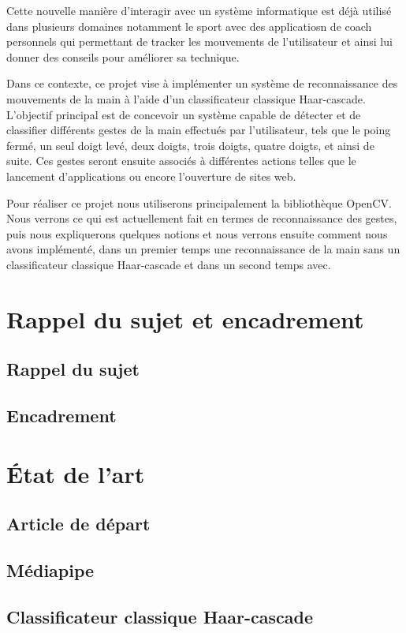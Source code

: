 \documentclass[11pt]{article}
\begin{document}
Cette nouvelle manière d'interagir avec un système informatique est déjà utilisé dans plusieurs domaines notamment le sport avec des applicatiosn de coach personnels qui permettant de tracker les mouvements de l'utilisateur et ainsi lui donner des conseils pour améliorer sa technique. \bigbreak

Dans ce contexte, ce projet vise à implémenter un système de reconnaissance des mouvements de la main à l’aide d’un classificateur classique Haar-cascade. 
L'objectif principal est de concevoir un système capable de détecter et de classifier différents gestes de la main effectués par l'utilisateur, 
tels que le poing fermé, un seul doigt levé, deux doigts, trois doigts, quatre doigts, et ainsi de suite. Ces gestes seront ensuite associés à différentes 
actions telles que le lancement d'applications ou encore l'ouverture de sites web. \bigbreak

Pour réaliser ce projet nous utiliserons principalement la bibliothèque OpenCV. Nous verrons ce qui est actuellement fait en termes de reconnaissance des 
gestes, puis nous expliquerons quelques notions et nous verrons ensuite comment nous avons implémenté, dans un premier temps une reconnaissance de la main 
sans un classificateur classique Haar-cascade et dans un second temps avec.

\newpage

\section{Rappel du sujet et encadrement}
\subsection{Rappel du sujet}
\subsection{Encadrement}
\newpage

\section{\'Etat de l'art}
\subsection{Article de départ}
\subsection{Médiapipe}
\subsection{Classificateur classique Haar-cascade}
\newpage
\end{document}
